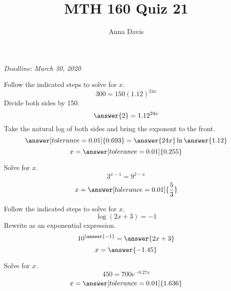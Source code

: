 \documentclass{ximera}
\author{Anna Davis} \title{MTH 160 Quiz 21}
\begin{document}
\begin{abstract}

\end{abstract}
\maketitle
 \textit{Deadline: March 30, 2020}
\begin{problem}\label{prob:quiz21prob1}
Follow the indicated steps to solve for $x$.
$$300=150(1.12)^{24x}$$
Divide both sides by 150.
$$\answer{2}=1.12^{24x}$$
Take the natural log of both sides and bring the exponent to the front.
$$\answer[tolerance=0.01]{0.693}=\answer{24x}\ln\answer{1.12}$$
$$x=\answer[tolerance=0.01]{0.255}$$
\end{problem}

\begin{problem}\label{prob:quiz21prob2}
Solve for $x$.
$$3^{x-1}=9^{2-x}$$
$$x=\answer[tolerance=0.01]{\frac{5}{3}}$$
\end{problem}

\begin{problem}\label{prob:quiz21prob3}
Follow the indicated steps to solve for $x$.
$$\log (2x+3)=-1$$
Rewrite as an exponential expression.
$$10^{\answer{-1}}=\answer{2x+3}$$
$$x=\answer{-1.45}$$
\end{problem}

\begin{problem}\label{prob:quiz21prob4}
Solve for $x$.
$$450=700e^{-0.27x}$$
$$x=\answer[tolerance=0.01]{1.636}$$
\end{problem}
\end{document}
